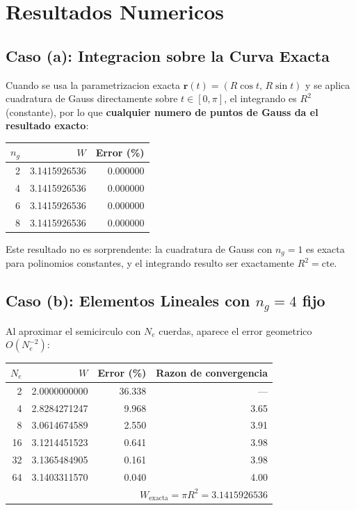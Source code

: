 \documentclass[12pt,a4paper]{article}
\begin{document}
\section{Resultados Numericos}

\subsection{Caso (a): Integracion sobre la Curva Exacta}

Cuando se usa la parametrizacion exacta $\mathbf{r}(t) = (R\cos t,\, R\sin t)$
y se aplica cuadratura de Gauss directamente sobre $t \in [0,\pi]$, el
integrando es $R^2$ (constante), por lo que \textbf{cualquier numero de
puntos de Gauss da el resultado exacto}:

\begin{center}
\begin{tabular}{rrr}
\toprule
$n_g$ & $W$ & Error (\%) \\
\midrule
2 & 3.1415926536 & 0.000000 \\
4 & 3.1415926536 & 0.000000 \\
6 & 3.1415926536 & 0.000000 \\
8 & 3.1415926536 & 0.000000 \\
\bottomrule
\end{tabular}
\end{center}

Este resultado no es sorprendente: la cuadratura de Gauss con $n_g = 1$
es exacta para polinomios constantes, y el integrando resulto ser exactamente
$R^2 = \text{cte}$.

\subsection{Caso (b): Elementos Lineales con $n_g = 4$ fijo}

Al aproximar el semicirculo con $N_e$ cuerdas, aparece el error geometrico
$O(N_e^{-2})$:

\begin{center}
\begin{tabular}{rrrr}
\toprule
$N_e$ & $W$ & Error (\%) & Razon de convergencia \\
\midrule
 2 & 2.0000000000 & 36.338 & ---  \\
 4 & 2.8284271247 &  9.968 & 3.65 \\
 8 & 3.0614674589 &  2.550 & 3.91 \\
16 & 3.1214451523 &  0.641 & 3.98 \\
32 & 3.1365484905 &  0.161 & 3.98 \\
64 & 3.1403311570 &  0.040 & 4.00 \\
\bottomrule
\multicolumn{4}{r}{$W_{\text{exacta}} = \pi R^2 = 3.1415926536$}
\end{tabular}
\end{center}
\end{document}
